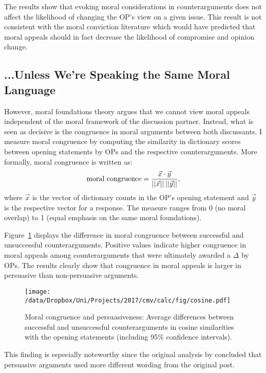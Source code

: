 The results show that evoking moral considerations in counterarguments does not affect the likelihood of changing the OP's view on a given issue. This result is not consistent with the moral conviction literature which would have predicted that moral appeals should in fact decrease the likelihood of compromise and opinion change.


\subsection{...Unless We're Speaking the Same Moral Language}

However, moral foundations theory argues that we cannot view moral appeals independent of the moral framework of the discussion partner. Instead, what is seen as decisive is the congruence in moral arguments between both discussants. I measure moral congruence by computing the similarity in dictionary scores between opening statements by OPs and the respective counterarguments. More formally, moral congruence is written as:
\begin{equation}
\text{moral congruence}=\dfrac{\vec{x}\cdot \vec{y}}{||\vec{x}||\hspace{.2em}||\vec{y}||},
\end{equation}
where $\vec{x}$ is the vector of dictionary counts in the OP's opening statement and $\vec{y}$ is the respective vector for a response. The measure ranges from 0 (no moral overlap) to 1 (equal emphasis on the same moral foundations).

Figure~\ref{fig:cosine} displays the difference in moral congruence between successful and unsuccessful counterarguments. Positive values indicate higher congruence in moral appeals among counterarguments that were ultimately awarded a $\Delta$ by OPs. The results clearly show that congruence in moral appeals is larger in persuasive than non-persuasive arguments.

\begin{figure}[ht]
\centering
\texttt{[image: /data/Dropbox/Uni/Projects/2017/cmv/calc/fig/cosine.pdf]}
\caption{Moral congruence and persuasiveness: Average differences between successful and unsuccessful counterarguments in cosine similarities with the opening statements (including 95\% confidence intervals).}\label{fig:cosine}
\end{figure}

This finding is especially noteworthy since the original analysis by \citet[6]{tan2016winning} concluded that persuasive arguments used more different wording from the original post. %

